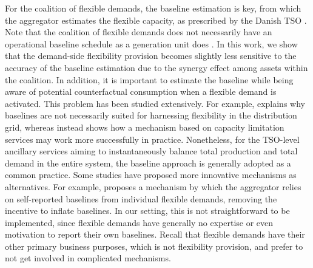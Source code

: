 \documentclass[conference]{IEEEtran}
\begin{document}
For the coalition of flexible demands, the baseline estimation is key, from which the aggregator estimates the flexible capacity, as prescribed by the Danish TSO \cite{energinet:prequalification}. Note that the coalition of flexible demands does not necessarily have an operational baseline schedule as a generation unit does \cite{gade2022ecosystem}.
%
In this work, we show that the demand-side flexibility provision becomes slightly less sensitive to the accuracy of the baseline estimation due to the synergy effect among assets within the coalition.
In addition, it is important to estimate the baseline while being aware of potential counterfactual consumption when a flexible demand is activated. This problem has been studied extensively. For example, \cite{ziras2021baselines} explains why baselines are not necessarily suited for harnessing flexibility in the distribution grid, whereas \cite{capacity_limitation_services} instead shows how a mechanism based on capacity limitation services may work more successfully in practice. Nonetheless, for the TSO-level ancillary services aiming to instantaneously balance total production and total demand in the entire system, the baseline approach is generally adopted as a common practice. Some studies have proposed more innovative mechanisms as alternatives. For example, \cite{muthirayan2019mechanism} proposes a mechanism by which the aggregator relies on self-reported baselines from individual flexible demands, removing the incentive to inflate baselines. In our setting, this is not straightforward to be implemented, since flexible demands have generally no expertise or even motivation to report their own baselines. Recall that flexible demands have their other primary business purposes, which is not flexibility provision, and prefer to not get involved in complicated mechanisms.



\end{document}
